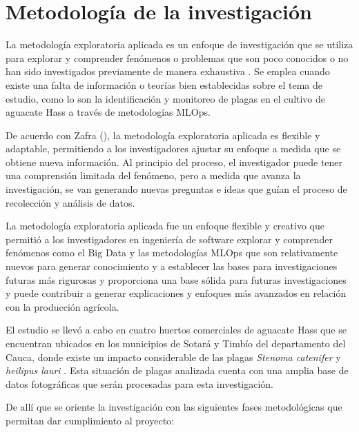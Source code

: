 \section{Metodología de la investigación}
La metodología exploratoria aplicada es un enfoque de investigación que se utiliza para explorar y comprender fenómenos o problemas que son poco conocidos o no han sido investigados previamente de manera exhaustiva \citep{zafra2006}. Se emplea cuando existe una falta de información o teorías bien establecidas sobre el tema de estudio, como lo son la identificación y monitoreo de plagas en el cultivo de aguacate Hass a través de metodologías MLOps.

De acuerdo con Zafra (\citeyear{zafra2006}), la metodología exploratoria aplicada es flexible y adaptable, permitiendo a los investigadores ajustar su enfoque a medida que se obtiene nueva información. Al principio del proceso, el investigador puede tener una comprensión limitada del fenómeno, pero a medida que avanza la investigación, se van generando nuevas preguntas e ideas que guían el proceso de recolección y análisis de datos.

La metodología exploratoria aplicada fue un enfoque flexible y creativo que permitió a los investigadores en ingeniería de software explorar y comprender fenómenos como el Big Data y las metodologías MLOps que son relativamente nuevos para generar conocimiento y a establecer las bases para investigaciones futuras más rigurosas y proporciona una base sólida para futuras investigaciones y puede contribuir a generar explicaciones y enfoques más avanzados en relación con la producción agrícola.

El estudio se llevó a cabo en cuatro huertos comerciales de aguacate Hass que se encuentran ubicados en los municipios de Sotará y Timbío del departamento del Cauca, donde existe un impacto considerable de las plagas \textit{Stenoma catenifer} y \textit{heilipus lauri} \citep{zapata2022}. Esta situación de plagas analizada cuenta con una amplia base de datos fotográficas que serán procesadas para esta investigación.

De allí que se oriente la investigación con las siguientes fases metodológicas que permitan dar cumplimiento al proyecto:

